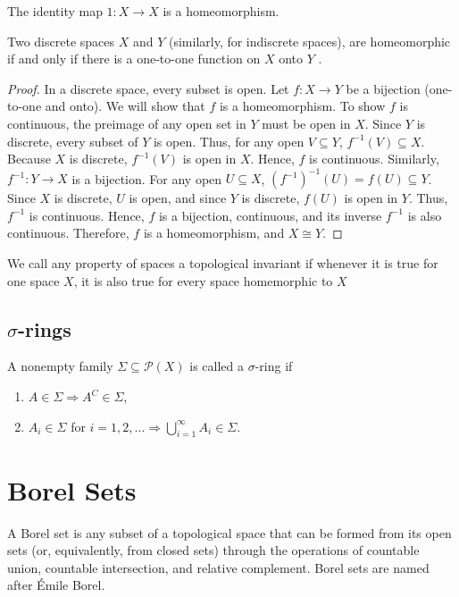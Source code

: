 \documentclass[12pt]{article} %
\begin{document}
\begin{example}
The identity map $1 : X\to X$ is a homeomorphism.
\end{example}

\begin{example}
Two discrete spaces $X$ and $Y$ (similarly, for indiscrete spaces), are homeomorphic if and only if there is a one-to-one function on $X$ onto $Y$ .
\end{example}
\begin{proof}
In a discrete space, every subset is open. Let \( f : X \to Y \) be a bijection (one-to-one and onto). We will show that \( f \) is a homeomorphism. To show \( f \) is continuous, the preimage of any open set in \( Y \) must be open in \( X \). Since \( Y \) is discrete, every subset of \( Y \) is open. Thus, for any open \( V \subseteq Y \),  \( f^{-1}(V) \subseteq X \). Because \( X \) is discrete, \( f^{-1}(V) \) is open in \( X \). Hence, \( f \) is continuous. Similarly, \( f^{-1} : Y \to X \) is a bijection. For any open \( U \subseteq X \), $(f^{-1})^{-1}(U) = f(U) \subseteq Y$. Since \( X \) is discrete, \( U \) is open, and since \( Y \) is discrete, \( f(U) \) is open in \( Y \).  
Thus, \( f^{-1} \) is continuous. Hence, \( f \) is a bijection, continuous, and its inverse \( f^{-1} \) is also continuous. Therefore, \( f \) is a homeomorphism, and \( X \cong Y \).
\end{proof}

\begin{definition}
    We call any property of spaces a topological invariant if whenever it is true for one space $X$, it is also true for every space homemorphic to $X$
\end{definition}


\subsection{$\sigma$-rings}
\begin{definition}
	A nonempty family $\Sigma \subseteq \mathcal{P}(X)$ is called a $\sigma$-ring if
	\begin{enumerate}
		\item $A \in \Sigma \Rightarrow  A^C \in \Sigma$,
		\item $A_i \in \Sigma$ for $i = 1, 2, \dots \Rightarrow \bigcup_{i=1}^\infty A_i \in \Sigma$.
	\end{enumerate}
\end{definition}

\section{Borel Sets}
A Borel set is any subset of a topological space that can be formed from its open sets (or, equivalently, from closed sets) through the operations of countable union, countable intersection, and relative complement. Borel sets are named after Émile Borel.
\end{document}
